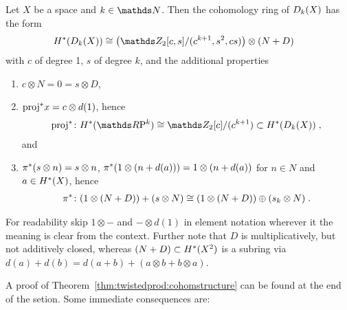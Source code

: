 \begin{Thm}\label{thm:twistedprod:cohomstructure}
  Let $X$ be a space and $k\in\Nat$.
  Then the cohomology ring of $D_{k}({X})$ has the form
  \begin{align*}
    \H^*(\Twistedprod{k}{X})
    &\cong
      \left(
      \Zmod2[c,s]/(c^{k+1},s^2,cs)
      \right)
      \otimes (N+D)
  \end{align*}
  with $c$ of degree 1, $s$ of degree $k$, and the additional
  properties
  \begin{enumerate}
  \item $c\otimes N=0=s\otimes D$, 
  \item ${\mathrm{proj}}^* x = c\otimes d(1)$,
    hence
    \begin{gather*}
      \pb\proj\colon\H^*(\RP k)\cong
      \Zmod2[c]/(c^{k+1})\subset\H^*(\Twistedprod k X)
      \;,
    \end{gather*}
    and
  \item\label{item:twistedprodcohom:pi}
    ${\pi}^* (s\otimes n) = s\otimes n$,
    ${\pi}^* (1\otimes (n+d(a))) = 1\otimes (n+d(a))$
    for $n\in N$ and $a\in H^*(X)$,
    hence
    \begin{gather*}
      {\pi}^*\colon (1\otimes(N+D)) + (s\otimes N)
      \cong (1\otimes(N+D))\oplus (s_k\otimes N)
      \;.
    \end{gather*}
  \end{enumerate}
  For readability skip $1\otimes-$ and $-\otimes d(1)$ in element
  notation wherever it the meaning is clear from the context.
  Further note that $D$ is multiplicatively, but not additively closed,
  whereas $(N+D)\subset H^*(X^2)$ is a subring via
  $d(a)+d(b) = d(a+b)+(a\otimes b+ b\otimes a)$.
\end{Thm}
A proof of Theorem~\ref{thm:twistedprod:cohomstructure} can be found
at the end of the setion.
Some immediate consequences are:

